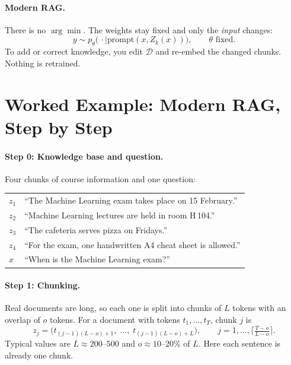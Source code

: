 \documentclass[11pt]{article}
\begin{document}
\paragraph{Modern RAG.} There is no $\arg\min$. The weights stay fixed and only the \emph{input} changes:
\begin{equation}
  y \sim p_{\theta}\big(\,\cdot \mid \mathrm{prompt}(x, Z_k(x))\big), \qquad \theta \text{ fixed}.
\end{equation}
To add or correct knowledge, you edit $\mathcal{D}$ and re-embed the changed chunks. Nothing is retrained.

\section{Worked Example: Modern RAG, Step by Step}

\paragraph{Step 0: Knowledge base and question.}
Four chunks of course information and one question:
\begin{center}
\begin{tabular}{@{}ll@{}}
\toprule
$z_1$ & ``The Machine Learning exam takes place on 15 February.'' \\
$z_2$ & ``Machine Learning lectures are held in room H\,104.'' \\
$z_3$ & ``The cafeteria serves pizza on Fridays.'' \\
$z_4$ & ``For the exam, one handwritten A4 cheat sheet is allowed.'' \\
\midrule
$x$ & ``When is the Machine Learning exam?'' \\
\bottomrule
\end{tabular}
\end{center}

\paragraph{Step 1: Chunking.}
Real documents are long, so each one is split into chunks of $L$ tokens with an overlap of $o$ tokens. For a document with tokens $t_1, \dots, t_T$, chunk $j$ is
\begin{equation}
  z_j = \big(t_{(j-1)(L-o)+1},\; \dots,\; t_{(j-1)(L-o)+L}\big), \qquad j = 1, \dots, \Big\lceil \tfrac{T-o}{L-o} \Big\rceil.
\end{equation}
Typical values are $L \approx 200$--$500$ and $o \approx 10$--$20\%$ of $L$. Here each sentence is already one chunk.
\end{document}
